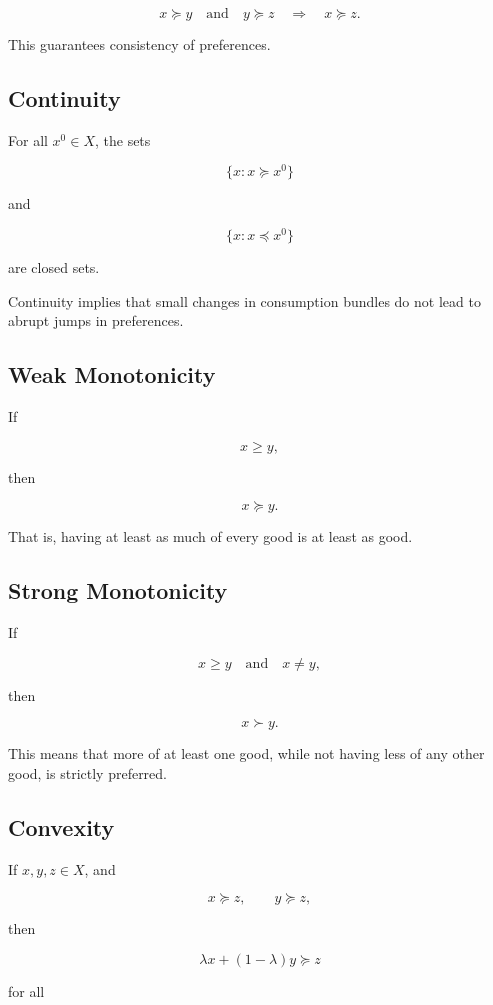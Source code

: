 \[
x \succeq y
\quad \text{and} \quad
y \succeq z
\quad \Rightarrow \quad
x \succeq z.
\]

This guarantees consistency of preferences.

\subsection{Continuity}

For all \(x^0 \in X\), the sets

\[
\{x : x \succeq x^0\}
\]

and

\[
\{x : x \preceq x^0\}
\]

are closed sets.

Continuity implies that small changes in consumption bundles do not lead to abrupt jumps in preferences.

\subsection{Weak Monotonicity}

If

\[
x \ge y,
\]

then

\[
x \succeq y.
\]

That is, having at least as much of every good is at least as good.

\subsection{Strong Monotonicity}

If

\[
x \ge y
\quad \text{and} \quad
x \ne y,
\]

then

\[
x \succ y.
\]

This means that more of at least one good, while not having less of any other good, is strictly preferred.

\subsection{Convexity}

If \(x,y,z \in X\), and

\[
x \succeq z,
\qquad
y \succeq z,
\]

then

\[
\lambda x + (1-\lambda)y \succeq z
\]

for all

